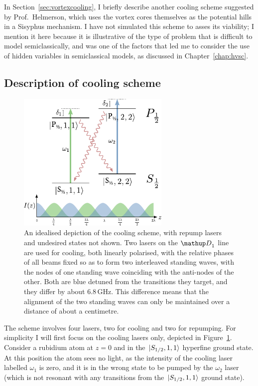 In Section~\ref{sec:vortexcooling}, I briefly describe another cooling scheme suggested by Prof.~Helmerson, which uses the vortex cores themselves as the potential hills in a Sisyphus mechanism. I have not simulated this scheme to asses its viability; I mention it here because it is illustrative of the type of problem that is difficult to model semiclassically, and was one of the factors that led me to consider the use of hidden variables in semiclassical models, as discussed in Chapter~\ref{chap:hvsc}.


\subsection{Description of cooling scheme}

\begin{figure}
\begin{center}
\includegraphics[width=0.65\textwidth]{figures/unsorted/cooling_simplified.pdf}
\caption{\label{fig:cooling_simplified}An idealised depiction of the cooling scheme, with repump lasers and undesired states not shown. Two lasers on the $\up{D}_1$ line are used for cooling, both linearly polarised, with the relative phases of all beams fixed so as to form two interleaved standing waves, with the nodes of one standing wave coinciding with the anti-nodes of the other. Both are blue detuned from the transitions they target, and they differ by about $6.8\,$GHz. This difference means that the alignment of the two standing waves can only be maintained over a distance of about a centimetre.}
\end{center}
\end{figure}

The scheme involves four lasers, two for cooling and two for repumping. For simplicity I will first focus on the cooling lasers only, depicted in Figure~\ref{fig:cooling_simplified}. Consider a rubidium atom at $z=0$ and in the $\ket{S_{1/2}, 1,1}$ hyperfine ground state. At this position the atom sees no light, as the intensity of the cooling laser labelled $\omega_1$ is zero, and it is in the wrong state to be pumped by the $\omega_2$ laser (which is not resonant with any transitions from the $\ket{S_{1/2}, 1,1}$ ground state).

